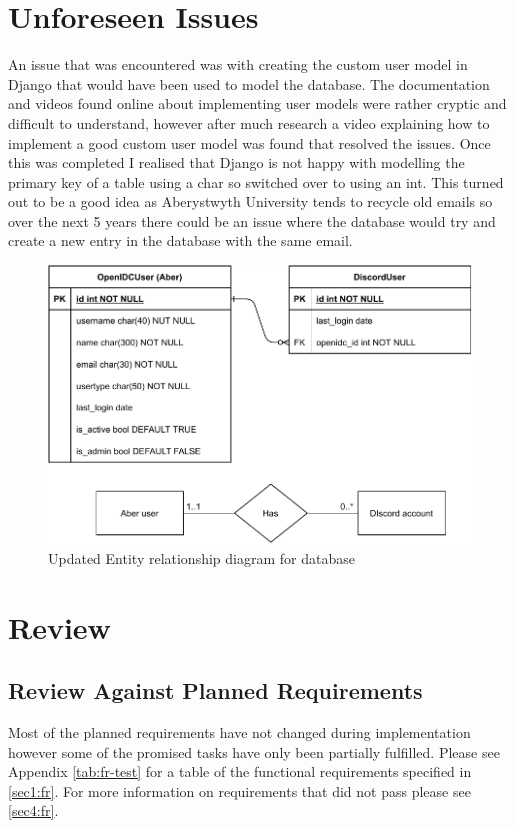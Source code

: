 \section{Unforeseen Issues}\label{sec3:unforeseen}
An issue that was encountered was with creating the custom user model in Django that would have been used to model the database. The documentation and videos found online about implementing user models were rather cryptic and difficult to understand, however after much research a video explaining how to implement a good custom user model was found that resolved the issues. Once this was completed I realised that Django is not happy with modelling the primary key of a table using a char so switched over to using an int. This turned out to be a good idea as Aberystwyth University tends to recycle old emails so over the next 5 years there could be an issue where the database would try and create a new entry in the database with the same email.
\begin{figure}[H]
	\centering
	\includegraphics[width=0.8\linewidth]{Figures/database-er-1}
	\caption{Updated Entity relationship diagram for database}
	\label{fig:database-er-1}
\end{figure}

\section{Review}
\subsection{Review Against Planned Requirements}\label{sec3:pr}
Most of the planned requirements have not changed during implementation however some of the promised tasks have only been partially fulfilled. Please see Appendix \ref{tab:fr-test} for a table of the functional requirements specified in \ref{sec1:fr}. For more information on requirements that did not pass please see \ref{sec4:fr}.

